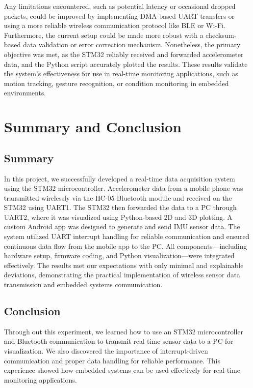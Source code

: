 \documentclass[A4paper,12pt]{extreport}
\begin{document}
Any limitations encountered, such as potential latency or occasional dropped packets, could be improved by implementing DMA-based UART transfers or using a more reliable wireless communication protocol like BLE or Wi-Fi. Furthermore, the current setup could be made more robust with a checksum-based data validation or error correction mechanism. Nonetheless, the primary objective was met, as the STM32 reliably received and forwarded accelerometer data, and the Python script accurately plotted the results. These results validate the system’s effectiveness for use in real-time monitoring applications, such as motion tracking, gesture recognition, or condition monitoring in embedded environments.





\chapter{Summary and Conclusion}


\section{Summary}

In this project, we successfully developed a real-time data acquisition system using the STM32 microcontroller. Accelerometer data from a mobile phone was transmitted wirelessly via the HC-05 Bluetooth module and received on the STM32 using UART1. The STM32 then forwarded the data to a PC through UART2, where it was visualized using Python-based 2D and 3D plotting. A custom Android app was designed to generate and send IMU sensor data. The system utilized UART interrupt handling for reliable communication and ensured continuous data flow from the mobile app to the PC. All components—including hardware setup, firmware coding, and Python visualization—were integrated effectively. The results met our expectations with only minimal and explainable deviations, demonstrating the practical implementation of wireless sensor data transmission and embedded systems communication.

\section{Conclusion}
 Through out this experiment, we learned how to use an STM32 microcontroller and Bluetooth communication to transmit real-time sensor data to a PC for visualization. We also discovered the importance of interrupt-driven communication and proper data handling for reliable performance. This experience showed how embedded systems can be used effectively for real-time monitoring applications.


\cleardoublepage
{}
\renewcommand\bibname{References}


\pagebreak
\end{document}
